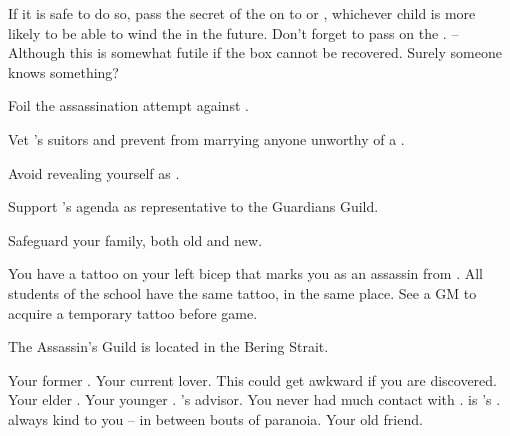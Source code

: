 \documentclass[char]{NeptuneBall}
\begin{document}
\begin{itemz}[Goals]
  \item If it is safe to do so, pass the secret of the \iMusicBox{} on to \cAriel{} or \cPrincess{}, whichever child is more likely to be able to wind the \iMusicBox{} in the future. Don't forget to pass on the \iMusicBoxKey{}. -- Although this is somewhat futile if the box cannot be recovered. Surely someone knows something?
  \item Foil the assassination attempt against \cKing{}.
  \item Vet \cPrincess{}'s suitors and prevent \cPrincess{\them} from marrying anyone unworthy of a \cPrincess{\prince}.
  \item Avoid revealing yourself as \cQueen{\King} \cQueen{}.
	\item Support \cGeneral{}'s agenda as representative to the Guardians Guild.
	\item Safeguard your family, both old and new.
\end{itemz}


\begin{itemz}[Notes]
  \item You have a tattoo on your left bicep that marks you as an assassin from \pAssassin{}. All students of the school have the same tattoo, in the same place. See a GM to acquire a temporary tattoo before game.
\end{itemz}

\begin{itemz}[Trivia]
  \item The Assassin's Guild is located in the Bering Strait.
\end{itemz}

\begin{contacts}
  \contact{\cKing{}} Your former \cKing{\spouse}.
  \contact{\cGeneral{}} Your current lover. This could get awkward if you are discovered.
  \contact{\cAriel{}} Your elder \cAriel{\offspring}.
  \contact{\cPrincess{}} Your younger \cPrincess{{\offspring}}.
  \contact{\cManta{}} \cKing{}'s advisor. You never had much contact with \cManta{\them}.
  \contact{\cPlant{}} \cPlant{} is \cKing{}'s \cPlant{\sibling}. \cPlant{\they} \cPlant{\were} always kind to you -- in between bouts of paranoia.
  \contact{\cDiplomat{}} Your old friend.
\end{contacts}
\end{document}
